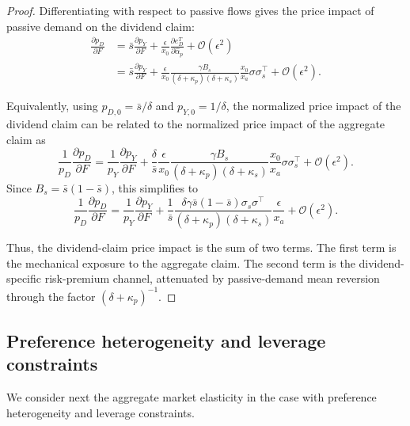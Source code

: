 \begin{proof}
Differentiating with respect to passive flows gives the price impact of passive demand on the dividend claim:
\begin{align}\label{eq:pD-price-impact-noheterog-final}
    \frac{\partial p_D}{\partial F}
    &=\bar{s}\frac{\partial p_Y}{\partial F}
    +\frac{\epsilon}{x_0}\frac{\partial e_D^T}{\partial\hat{\alpha}_p}
    +\mathcal{O}(\epsilon^2)\\
    &=\bar{s}\frac{\partial p_Y}{\partial F}
    +\frac{\epsilon}{x_0}
    \frac{\gamma B_s}{(\delta+\kappa_p)(\delta+\kappa_s)}\frac{x_0}{x_a}\sigma\sigma_s^\top
    +\mathcal{O}(\epsilon^2).
\end{align}

Equivalently, using $p_{D,0}=\bar{s}/\delta$ and $p_{Y,0}=1/\delta$, the normalized price impact of the dividend claim can be related to the normalized price impact of the aggregate claim as
\begin{equation}\label{eq:pD-pY-normalized-price-impact-noheterog}
    \frac{1}{p_D}\frac{\partial p_D}{\partial F}
    =
    \frac{1}{p_Y}\frac{\partial p_Y}{\partial F}
    +\frac{\delta}{\bar{s}}
    \frac{\epsilon}{x_0}
    \frac{\gamma B_s}{(\delta+\kappa_p)(\delta+\kappa_s)}
    \frac{x_0}{x_a}\sigma\sigma_s^\top
    +\mathcal{O}(\epsilon^2).
\end{equation}
Since $B_s=\bar{s}(1-\bar{s})$, this simplifies to
\begin{equation}\label{eq:pD-pY-normalized-price-impact-noheterog-simplified}
    \frac{1}{p_D}\frac{\partial p_D}{\partial F}
    =
    \frac{1}{p_Y}\frac{\partial p_Y}{\partial F}
    + \frac{1}{\bar{s}} \frac{\delta\gamma\bar{s}(1-\bar{s})\sigma_s\sigma^\top}{(\delta+\kappa_p)(\delta+\kappa_s)}
    \frac{\epsilon}{x_a}
    +\mathcal{O}(\epsilon^2).
\end{equation}

Thus, the dividend-claim price impact is the sum of two terms.
The first term is the mechanical exposure to the aggregate claim.
The second term is the dividend-specific risk-premium channel, attenuated by passive-demand mean reversion through the factor $(\delta+\kappa_p)^{-1}$.
\end{proof}

\subsection{Preference heterogeneity and leverage constraints}

We consider next the aggregate market elasticity in the case with preference heterogeneity and leverage constraints.

